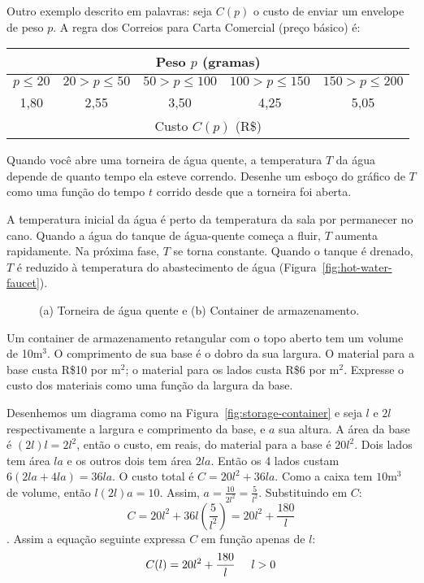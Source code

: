 Outro exemplo descrito em palavras: seja $C(p)$ o custo de enviar um envelope de peso $p$. A regra dos Correios para Carta Comercial (preço básico) é: 
\vspace{-0.3cm}\begin{table}[!ht]
  \setlength\tabcolsep{0.04cm}
  \centering
	\begin{tabular}{|c|c|c|c|c|}\hline
    \multicolumn{5}{|c|}{Peso $p$ (gramas)}\\\hline
		$p \leq 20$ & $20 > p \leq 50$ & $50 > p \leq 100$ & $100 > p \leq 150$ & $150 > p \leq 200$\\\hline
		1,80&2,55&3,50&4,25&5,05\\\hline
    \multicolumn{5}{|c|}{Custo $C(p)$ (R\$)}\\\hline
	\end{tabular}
  \vspace{-0.5cm}
\end{table}

 Quando você abre uma torneira de água quente, a temperatura $T$ da água depende de quanto tempo ela esteve correndo. Desenhe um esboço do gráfico de $T$ como uma função do tempo $t$ corrido desde que a torneira foi aberta.

\solution A temperatura inicial da água é perto da temperatura da sala por permanecer no cano. Quando a água do tanque de água-quente começa a fluir, $T$ aumenta rapidamente. Na próxima fase, $T$ se torna constante. Quando o tanque é drenado, $T$ é reduzido à temperatura do abastecimento de água (Figura~\ref{fig:hot-water-faucet}).

\begin{figure}[!ht]
  \centering
  \caption{(a) Torneira de água quente e (b) Container de armazenamento.}
  \vspace{-0.5cm}
\end{figure}

 Um container de armazenamento retangular com o topo aberto tem um volume de 10$\si\meter^3$. O comprimento de sua base é o dobro da sua largura. O material para a base custa R\$10 por $\si{\meter}^2$; o material para os lados custa R\$6 por $\si{\meter}^2$. Expresse o custo dos materiais como uma função da largura da base.

\solution Desenhemos um diagrama como na Figura~\ref{fig:storage-container} e seja $l$ e $2l$ respectivamente a largura e comprimento da base, e $a$ sua altura. A área da base é $(2l)l=2l^2$, então o custo, em reais, do material para a base é $20l^2$. Dois lados tem área $la$ e os outros dois tem área $2la$. Então os 4 lados custam $6(2la + 4la)=36la$. O custo total é $C=20l^2+36la$. Como a caixa tem $10\si\meter^3$ de volume, então $l(2l)a = 10$. Assim, $\displaystyle a=\frac{10}{2l^2}=\frac{5}{l^2}$. Substituindo em $C$: $$C = 20l^2+36l\left(\frac{5}{l^2}\right) = 20l^2+\frac{180}{l}$$.
Assim a equação seguinte expressa $C$ em função apenas de $l$:
$$C(l)=20l^2+\frac{180}{l}\hspace{0.5cm} l > 0$$

